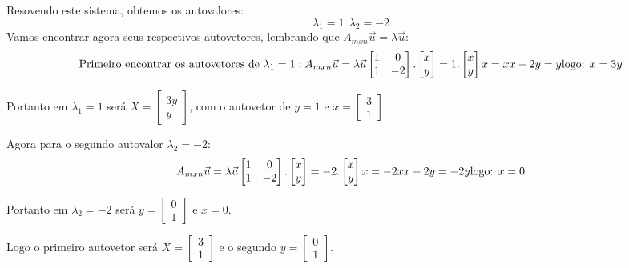 \documentclass[
]{book}
\begin{document}
Resovendo este sistema, obtemos os autovalores:
\[\lambda_1=1 \ \ \lambda_2=-2\]
Vamos encontrar agora seus respectivos autovetores, lembrando que \(A_{mxn}\vec{u}=\lambda \vec{u}\):
\[ \mbox{Primeiro encontrar os autovetores de }\lambda_1=1: \\
A_{mxn}\vec{u}=\lambda \vec{u} \\
\begin{bmatrix}
1 &0 \\ 
1 &-2 
\end{bmatrix}. \begin{bmatrix}
x \\ 
y  
\end{bmatrix}=1.\begin{bmatrix}
x \\ 
y  
\end{bmatrix} \\
x=x \\
x-2y=y \\ \mbox{logo: } x=3y\]

Portanto em \(\lambda_1=1\) será \(X=\begin{bmatrix}3y\\y\end{bmatrix}\), com o autovetor de \(y=1\) e \(x=\begin{bmatrix}3\\1\end{bmatrix}\).

Agora para o segundo autovalor \(\lambda_2=-2\):
\[A_{mxn}\vec{u}=\lambda \vec{u} \\
\begin{bmatrix}
1 &0 \\ 
1 &-2 
\end{bmatrix}. \begin{bmatrix}
x \\ 
y  
\end{bmatrix}=-2.\begin{bmatrix}
x \\ 
y  
\end{bmatrix} \\
x=-2x \\
x-2y=-2y \\ \mbox{logo: } x=0\]

Portanto em \(\lambda_2=-2\) será \(y=\begin{bmatrix}0\\1\end{bmatrix}\) e \(x=0\).

Logo o primeiro autovetor será \(X=\begin{bmatrix}3\\1\end{bmatrix}\) e o segundo \(y=\begin{bmatrix}0\\1\end{bmatrix}\).
\end{document}
